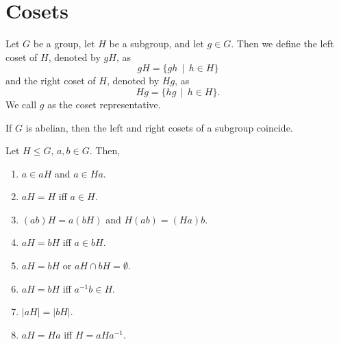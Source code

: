 \section{Cosets}
    \renewcommand{\leftmark}{May 06, 2024}

    \begin{dfn}[Coset]
        Let \(G\) be a group, let \(H\) be a subgroup, and let \(g\in G\). Then we define the left coset of \(H\), denoted by \(gH\), as \[gH = \{gh \,\mid\, h\in H\}\] and the right coset of \(H\), denoted by \(Hg\), as \[Hg = \{hg\,\mid\, h\in H\}.\] We call \(g\) as the coset representative.
    \end{dfn}

    \begin{note}
        If \(G\) is abelian, then the left and right cosets of a subgroup coincide.
    \end{note}

    \begin{thm}
        Let \(H \leq G\), \(a,b\in G\). Then,
        \begin{enumerate}
            \item \(a\in aH\) and \(a\in Ha\).
            \item \(aH = H\) iff \(a \in H\).
            \item \((ab)H = a(bH)\) and \(H(ab) = (Ha)b\).
            \item \(aH = bH\) iff \(a\in bH\).
            \item \(aH = bH\) or \(aH \cap bH = \emptyset\).
            \item \(aH = bH\) iff \(a^{-1}b \in H\).
            \item \(|aH| = |bH|\).
            \item \(aH = Ha\) iff \(H = aHa^{-1}\).
        \end{enumerate}
    \end{thm}

